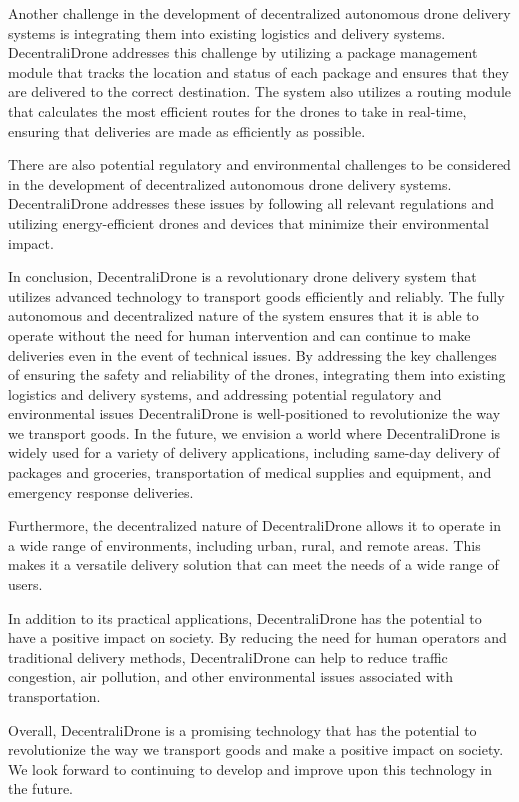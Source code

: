 \documentclass[conference]{IEEEtran}
\begin{document}
Another challenge in the development of decentralized autonomous drone delivery systems is integrating them into existing logistics and delivery systems. DecentraliDrone addresses this challenge by utilizing a package management module that tracks the location and status of each package and ensures that they are delivered to the correct destination. The system also utilizes a routing module that calculates the most efficient routes for the drones to take in real-time, ensuring that deliveries are made as efficiently as possible.

There are also potential regulatory and environmental challenges to be considered in the development of decentralized autonomous drone delivery systems. DecentraliDrone addresses these issues by following all relevant regulations and utilizing energy-efficient drones and devices that minimize their environmental impact.

In conclusion, DecentraliDrone is a revolutionary drone delivery system that utilizes advanced technology to transport goods efficiently and reliably. The fully autonomous and decentralized nature of the system ensures that it is able to operate without the need for human intervention and can continue to make deliveries even in the event of technical issues. By addressing the key challenges of ensuring the safety and reliability of the drones, integrating them into existing logistics and delivery systems, and addressing potential regulatory and environmental issues DecentraliDrone is well-positioned to revolutionize the way we transport goods. In the future, we envision a world where DecentraliDrone is widely used for a variety of delivery applications, including same-day delivery of packages and groceries, transportation of medical supplies and equipment, and emergency response deliveries.

Furthermore, the decentralized nature of DecentraliDrone allows it to operate in a wide range of environments, including urban, rural, and remote areas. This makes it a versatile delivery solution that can meet the needs of a wide range of users.

In addition to its practical applications, DecentraliDrone has the potential to have a positive impact on society. By reducing the need for human operators and traditional delivery methods, DecentraliDrone can help to reduce traffic congestion, air pollution, and other environmental issues associated with transportation.

Overall, DecentraliDrone is a promising technology that has the potential to revolutionize the way we transport goods and make a positive impact on society. We look forward to continuing to develop and improve upon this technology in the future.
\end{document}
